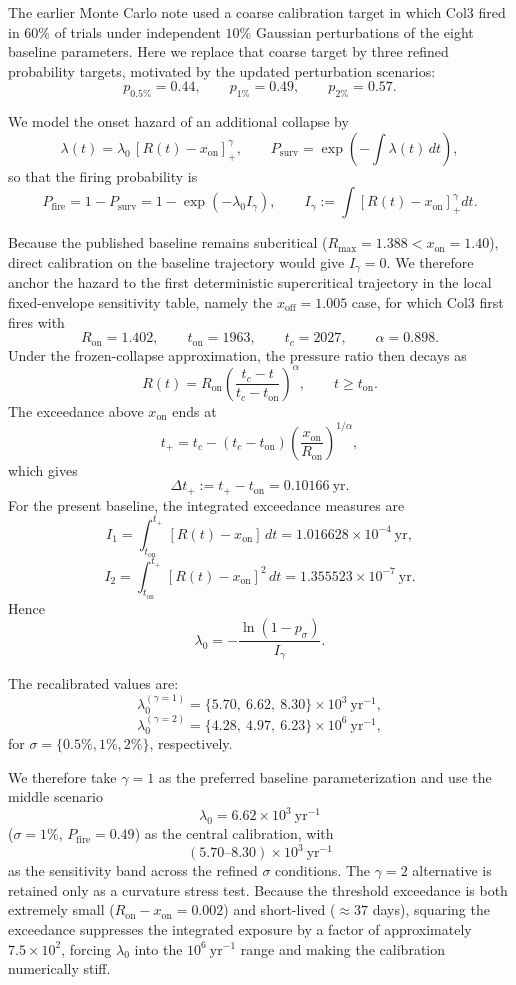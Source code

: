 \documentclass[11pt]{article}
\begin{document}
 The earlier Monte Carlo note used a coarse calibration target in which Col3 fired in
$60\%$ of trials under independent $10\%$ Gaussian perturbations of the eight baseline
parameters. Here we replace that coarse target by three refined probability targets,
motivated by the updated perturbation scenarios:
\[
p_{0.5\%}=0.44,\qquad p_{1\%}=0.49,\qquad p_{2\%}=0.57.
\]

We model the onset hazard of an additional collapse by
\[
\lambda(t)=\lambda_0\,[R(t)-x_{\mathrm{on}}]_+^\gamma,
\qquad
P_{\mathrm{surv}}=\exp\!\left(-\int \lambda(t)\,dt\right),
\]
so that the firing probability is
\[
P_{\mathrm{fire}}=1-P_{\mathrm{surv}}
=1-\exp\!\left(-\lambda_0 I_\gamma\right),
\qquad
I_\gamma:=\int [R(t)-x_{\mathrm{on}}]_+^\gamma dt.
\]

Because the published baseline remains subcritical
(\(R_{\max}=1.388 < x_{\mathrm{on}}=1.40\)),
direct calibration on the baseline trajectory would give \(I_\gamma=0\).
We therefore anchor the hazard to the first deterministic supercritical trajectory
in the local fixed-envelope sensitivity table, namely the \(x_{\mathrm{off}}=1.005\)
case, for which Col3 first fires with
\[
R_{\mathrm{on}}=1.402,\qquad t_{\mathrm{on}}=1963,\qquad t_c=2027,\qquad \alpha=0.898.
\]
Under the frozen-collapse approximation, the pressure ratio then decays as
\[
R(t)=R_{\mathrm{on}}
\left(\frac{t_c-t}{t_c-t_{\mathrm{on}}}\right)^\alpha,
\qquad t\ge t_{\mathrm{on}}.
\]
The exceedance above \(x_{\mathrm{on}}\) ends at
\[
t_+=t_c-(t_c-t_{\mathrm{on}})
\left(\frac{x_{\mathrm{on}}}{R_{\mathrm{on}}}\right)^{1/\alpha},
\]
which gives
\[
\Delta t_+:=t_+-t_{\mathrm{on}}=0.10166\ \mathrm{yr}.
\]
For the present baseline, the integrated exceedance measures are
\[
I_1=\int_{t_{\mathrm{on}}}^{t_+}[R(t)-x_{\mathrm{on}}]\,dt
=1.016628\times 10^{-4}\ \mathrm{yr},
\]
\[
I_2=\int_{t_{\mathrm{on}}}^{t_+}[R(t)-x_{\mathrm{on}}]^2\,dt
=1.355523\times 10^{-7}\ \mathrm{yr}.
\]
Hence
\[
\lambda_0 = -\frac{\ln(1-p_\sigma)}{I_\gamma}.
\]

The recalibrated values are:
\[
\lambda_0^{(\gamma=1)}
=
\{5.70,\ 6.62,\ 8.30\}\times 10^3\ \mathrm{yr}^{-1},
\]
\[
\lambda_0^{(\gamma=2)}
=
\{4.28,\ 4.97,\ 6.23\}\times 10^6\ \mathrm{yr}^{-1},
\]
for \(\sigma=\{0.5\%,1\%,2\%\}\), respectively.

We therefore take \(\gamma=1\) as the preferred baseline parameterization and use
the middle scenario
\[
\lambda_0 = 6.62\times 10^3\ \mathrm{yr}^{-1}
\]
(\(\sigma=1\%\), \(P_{\mathrm{fire}}=0.49\))
as the central calibration, with
\[
(5.70\text{--}8.30)\times 10^3\ \mathrm{yr}^{-1}
\]
as the sensitivity band across the refined \(\sigma\) conditions.
The \(\gamma=2\) alternative is retained only as a curvature stress test.
Because the threshold exceedance is both extremely small
(\(R_{\mathrm{on}}-x_{\mathrm{on}}=0.002\))
and short-lived (\(\approx 37\) days),
squaring the exceedance suppresses the integrated exposure by a factor of
approximately \(7.5\times 10^2\),
forcing \(\lambda_0\) into the \(10^6\ \mathrm{yr}^{-1}\) range and making the
calibration numerically stiff.
\end{document}
